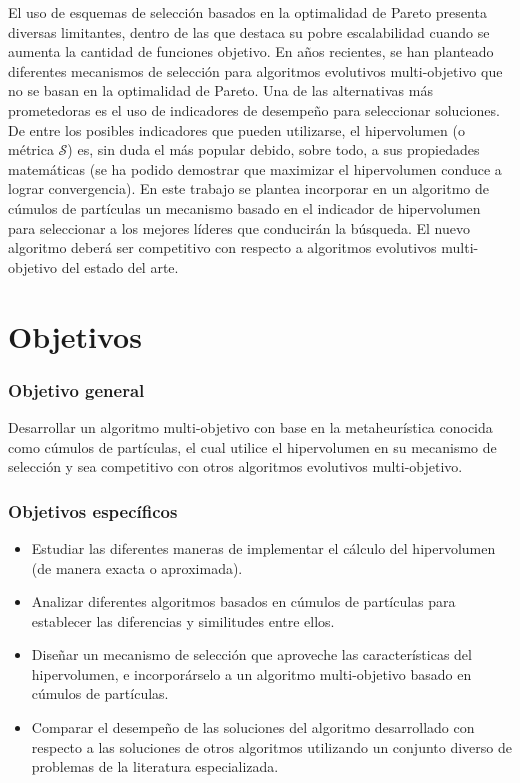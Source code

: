 El uso de esquemas de selecci\'on basados en la optimalidad de Pareto presenta diversas limitantes, dentro de las que destaca
su pobre escalabilidad cuando se aumenta la cantidad de funciones objetivo. En a\~nos recientes, se han planteado diferentes 
mecanismos de selecci\'on para algoritmos evolutivos multi-objetivo que no se basan en la optimalidad de Pareto. Una de las 
alternativas m\'as prometedoras es el uso de indicadores de desempe\~no para seleccionar soluciones. De entre los posibles 
indicadores que pueden utilizarse, el hipervolumen (o m\'etrica $\mathcal{S}$) es, sin duda el m\'as popular debido, sobre 
todo, a sus propiedades matem\'aticas (se ha podido demostrar que maximizar el hipervolumen conduce a lograr convergencia). 
En este trabajo se plantea incorporar en un algoritmo de c\'umulos de part\'iculas un mecanismo basado en el indicador de 
hipervolumen para seleccionar a los mejores l\'ideres que conducir\'an la b\'usqueda. El nuevo algoritmo deber\'a ser competitivo
con respecto a algoritmos evolutivos multi-objetivo del estado del arte.

\section*{Objetivos}

\subsubsection*{Objetivo general}

Desarrollar un algoritmo multi-objetivo con base en la metaheur\'istica conocida como c\'umulos de part\'iculas, el cual utilice el 
hipervolumen en su mecanismo de selecci\'on y sea competitivo con otros algoritmos evolutivos multi-objetivo.

\subsubsection*{Objetivos espec\'ificos}

\begin{itemize}
 \item Estudiar las diferentes maneras de implementar el c\'alculo del hipervolumen (de manera exacta o aproximada).
 \item Analizar diferentes algoritmos basados en c\'umulos de part\'iculas para establecer las diferencias y 
      similitudes entre ellos.
 \item Dise\~nar un mecanismo de selecci\'on que aproveche las caracter\'isticas del hipervolumen, e incorpor\'arselo 
 a un algoritmo multi-objetivo basado en c\'umulos de part\'iculas.
 \item Comparar el desempe\~no de las soluciones del algoritmo desarrollado con respecto a las soluciones de otros algoritmos
  utilizando un conjunto diverso de problemas de la literatura especializada.
\end{itemize}

